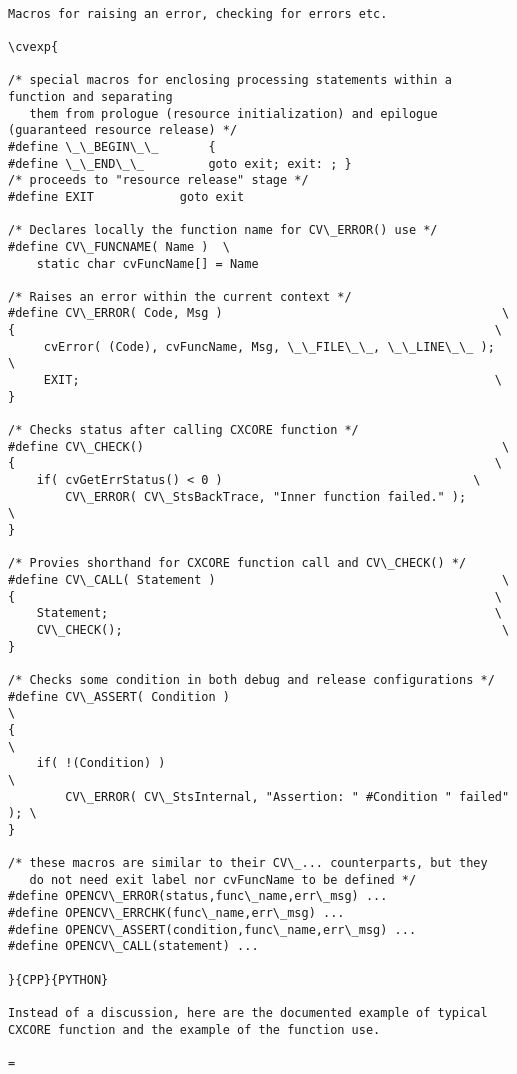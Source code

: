\begin{verbatim}

Macros for raising an error, checking for errors etc.

\cvexp{

/* special macros for enclosing processing statements within a function and separating
   them from prologue (resource initialization) and epilogue (guaranteed resource release) */
#define \_\_BEGIN\_\_       {
#define \_\_END\_\_         goto exit; exit: ; }
/* proceeds to "resource release" stage */
#define EXIT            goto exit

/* Declares locally the function name for CV\_ERROR() use */
#define CV\_FUNCNAME( Name )  \
    static char cvFuncName[] = Name

/* Raises an error within the current context */
#define CV\_ERROR( Code, Msg )                                       \
{                                                                   \
     cvError( (Code), cvFuncName, Msg, \_\_FILE\_\_, \_\_LINE\_\_ );        \
     EXIT;                                                          \
}

/* Checks status after calling CXCORE function */
#define CV\_CHECK()                                                  \
{                                                                   \
    if( cvGetErrStatus() < 0 )                                   \
        CV\_ERROR( CV\_StsBackTrace, "Inner function failed." );      \
}

/* Provies shorthand for CXCORE function call and CV\_CHECK() */
#define CV\_CALL( Statement )                                        \
{                                                                   \
    Statement;                                                      \
    CV\_CHECK();                                                     \
}

/* Checks some condition in both debug and release configurations */
#define CV\_ASSERT( Condition )                                          \
{                                                                       \
    if( !(Condition) )                                                  \
        CV\_ERROR( CV\_StsInternal, "Assertion: " #Condition " failed" ); \
}

/* these macros are similar to their CV\_... counterparts, but they
   do not need exit label nor cvFuncName to be defined */
#define OPENCV\_ERROR(status,func\_name,err\_msg) ...
#define OPENCV\_ERRCHK(func\_name,err\_msg) ...
#define OPENCV\_ASSERT(condition,func\_name,err\_msg) ...
#define OPENCV\_CALL(statement) ...

}{CPP}{PYTHON}

Instead of a discussion, here are the documented example of typical CXCORE function and the example of the function use.

=\end{verbatim}
